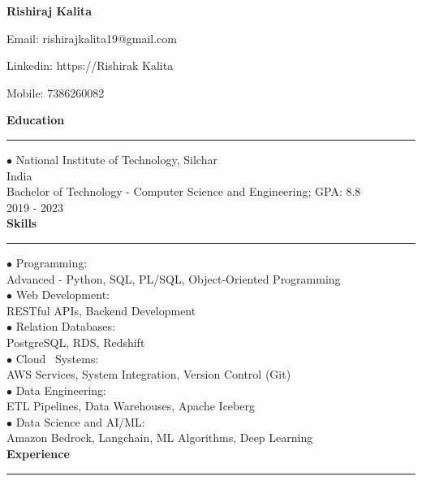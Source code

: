 \documentclass[11pt,a4paper]{article}
\renewcommand{\section}[1]{%
  \vspace{12pt}%
  {\large\bfseries #1}%
  \vspace{6pt}%
  \hrule%
  \vspace{6pt}%
}
\begin{document}
\begin{center}\Huge\textbf{Rishiraj Kalita}\\[0.5cm]\end{center}

\begin{center}Email: rishirajkalita19@gmail.com\end{center}
\begin{center}Linkedin: https://Rishirak Kalita\end{center}
\begin{center}Mobile: 7386260082\end{center}
\section{Education}

\noindent $\bullet$ National Institute of Technology, Silchar\\[0.2cm]
India\\[0.2cm]
Bachelor of Technology - Computer Science and Engineering; GPA: 8.8\\[0.2cm]
2019 - 2023\\[0.2cm]
\section{Skills}

\noindent $\bullet$ Programming:\\[0.2cm]
Advanced - Python, SQL, PL/SQL, Object-Oriented Programming\\[0.2cm]
\noindent $\bullet$ Web Development:\\[0.2cm]
RESTful APIs, Backend Development\\[0.2cm]
\noindent $\bullet$ Relation Databases:\\[0.2cm]
PostgreSQL, RDS, Redshift\\[0.2cm]
\noindent $\bullet$ Cloud \ Systems:\\[0.2cm]
AWS Services, System Integration, Version Control (Git)\\[0.2cm]
\noindent $\bullet$ Data Engineering:\\[0.2cm]
ETL Pipelines, Data Warehouses, Apache Iceberg\\[0.2cm]
\noindent $\bullet$ Data Science and AI/ML:\\[0.2cm]
Amazon Bedrock, Langchain, ML Algorithms, Deep Learning\\[0.2cm]
\section{Experience}
\end{document}
